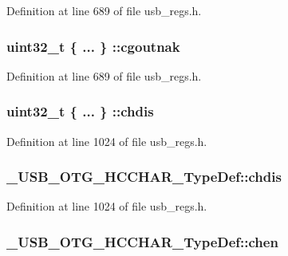 Definition at line 689 of file usb\-\_\-regs.\-h.

\hypertarget{group___u_s_b___o_t_g___d_r_i_v_e_r_gadaf60fea8e2121107ba9986ce0539080}{
\subsubsection[{cgoutnak}]{\setlength{\rightskip}{0pt plus 5cm}uint32\-\_\-t \{ ... \} \-::cgoutnak}}\label{group___u_s_b___o_t_g___d_r_i_v_e_r_gadaf60fea8e2121107ba9986ce0539080}


Definition at line 689 of file usb\-\_\-regs.\-h.

\hypertarget{group___u_s_b___o_t_g___d_r_i_v_e_r_gacad21a0b2c2f914b03f2c923e9a91aa5}{
\subsubsection[{chdis}]{\setlength{\rightskip}{0pt plus 5cm}uint32\-\_\-t \{ ... \} \-::chdis}}\label{group___u_s_b___o_t_g___d_r_i_v_e_r_gacad21a0b2c2f914b03f2c923e9a91aa5}


Definition at line 1024 of file usb\-\_\-regs.\-h.

\hypertarget{group___u_s_b___o_t_g___d_r_i_v_e_r_gaac1a578fcf20348513071fa7d0aa886e}{
\subsubsection[{chdis}]{ \-\_\-\-U\-S\-B\-\_\-\-O\-T\-G\-\_\-\-H\-C\-C\-H\-A\-R\-\_\-\-Type\-Def\-::chdis}}\label{group___u_s_b___o_t_g___d_r_i_v_e_r_gaac1a578fcf20348513071fa7d0aa886e}


Definition at line 1024 of file usb\-\_\-regs.\-h.

\hypertarget{group___u_s_b___o_t_g___d_r_i_v_e_r_ga11ea8f2d005f00de5417dd32e602ac59}{
\subsubsection[{chen}]{ \-\_\-\-U\-S\-B\-\_\-\-O\-T\-G\-\_\-\-H\-C\-C\-H\-A\-R\-\_\-\-Type\-Def\-::chen}}\label{group___u_s_b___o_t_g___d_r_i_v_e_r_ga11ea8f2d005f00de5417dd32e602ac59}


